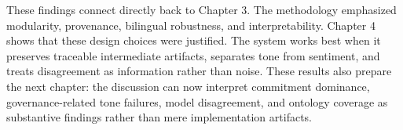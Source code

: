 These findings connect directly back to Chapter 3. The methodology emphasized modularity, provenance, bilingual robustness, and interpretability. Chapter 4 shows that these design choices were justified. The system works best when it preserves traceable intermediate artifacts, separates tone from sentiment, and treats disagreement as information rather than noise. These results also prepare the next chapter: the discussion can now interpret commitment dominance, governance-related tone failures, model disagreement, and ontology coverage as substantive findings rather than mere implementation artifacts.









